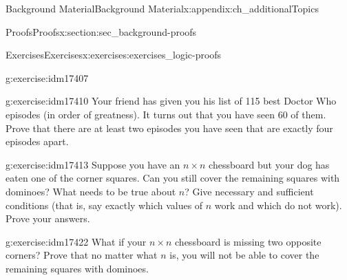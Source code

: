 \documentclass[oneside,10pt,]{book}
\numberwithin{equation}{chapter}
\begin{document}
\begin{appendixptx}{Background Material}{}{Background Material}{}{}{x:appendix:ch_additionalTopics}
\begin{sectionptx}{Proofs}{}{Proofs}{}{}{x:section:sec_background-proofs}
\begin{exercises-subsection}{Exercises}{}{Exercises}{}{}{x:exercises:exercises_logic-proofs}
\begin{divisionexercise}{17}{}{}{g:exercise:idm17407}
\end{divisionexercise}%
\begin{divisionexercise}{18}{}{}{g:exercise:idm17410}%
Your friend has given you his list of 115 best Doctor Who episodes (in order of greatness).  It turns out that you have seen 60 of them.  Prove that there are at least two episodes you have seen that are exactly four episodes apart.%
\end{divisionexercise}%
\begin{divisionexercise}{19}{}{}{g:exercise:idm17413}%
Suppose you have an \(n\times n\) chessboard but your dog has eaten one of the corner squares. Can you still cover the remaining squares with dominoes? What needs to be true about \(n\)? Give necessary and sufficient conditions (that is, say exactly which values of \(n\) work and which do not work). Prove your answers.%
\begin{sidebyside}{1}{0.4}{0.4}{0}%
\begin{sbspanel}{0.2}%
%
\end{sbspanel}%
\end{sidebyside}%
\end{divisionexercise}%
\begin{divisionexercise}{20}{}{}{g:exercise:idm17422}%
What if your \(n\times n\) chessboard is missing two opposite corners? Prove that no matter what \(n\) is, you will not be able to cover the remaining squares with dominoes.%
\begin{sidebyside}{1}{0.4}{0.4}{0}%
\begin{sbspanel}{0.2}%
%
\end{sbspanel}%

\end{sidebyside}
\end{divisionexercise}
\end{exercises-subsection}
\end{sectionptx}
\end{appendixptx}
\end{document}
